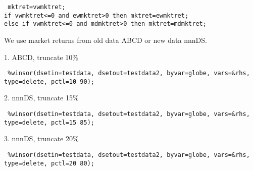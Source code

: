 

\usepackage[T1]{fontenc}




\thispagestyle{fancy}

\newcommand{\code}{\texttt}
\newcommand*{\Commonpath}{20190315}

\code{
	mktret=vwmktret; \\
	if vwmktret<=0 and ewmktret>0 then mktret=ewmktret; \\
	else if vwmktret<=0 and mdmktret>0 then mktret=mdmktret;
}

We use market returns from old data ABCD or new data nnnDS.

1. ABCD, truncate 10\%

\code{	
\%winsor(dsetin=testdata, dsetout=testdata2, byvar=globe, vars=\&rhs, type=delete, pctl=10 90);
}




2. nnnDS, truncate 15\%

\code{	
\%winsor(dsetin=testdata, dsetout=testdata2, byvar=globe, vars=\&rhs, type=delete, pctl=15 85);
}




3. nnnDS, truncate 20\%

\code{	
\%winsor(dsetin=testdata, dsetout=testdata2, byvar=globe, vars=\&rhs, type=delete, pctl=20 80);
}






